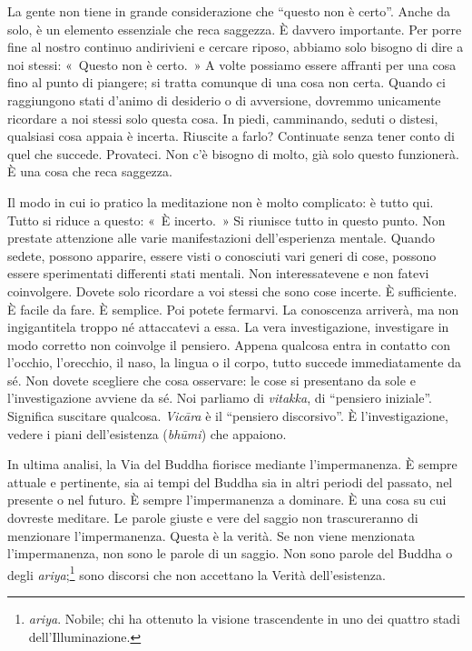 La gente non tiene in grande considerazione che ``questo non è certo''.
Anche da solo, è un elemento essenziale che reca saggezza. È davvero
importante. Per porre fine al nostro continuo andirivieni e cercare
riposo, abbiamo solo bisogno di dire a noi stessi: «~Questo non è
certo.~» A volte possiamo essere affranti per una cosa fino al punto di
piangere; si tratta comunque di una cosa non certa. Quando ci
raggiungono stati d'animo di desiderio o di avversione, dovremmo
unicamente ricordare a noi stessi solo questa cosa. In piedi,
camminando, seduti o distesi, qualsiasi cosa appaia è incerta. Riuscite
a farlo? Continuate senza tener conto di quel che succede. Provateci.
Non c'è bisogno di molto, già solo questo funzionerà. È una cosa che
reca saggezza.

Il modo in cui io pratico la meditazione non è molto complicato: è tutto
qui. Tutto si riduce a questo: «~È incerto.~» Si riunisce tutto in
questo punto. Non prestate attenzione alle varie manifestazioni
dell'esperienza mentale. Quando sedete, possono apparire, essere visti o
conosciuti vari generi di cose, possono essere sperimentati differenti
stati mentali. Non interessatevene e non fatevi coinvolgere. Dovete solo
ricordare a voi stessi che sono cose incerte. È sufficiente. È facile da
fare. È semplice. Poi potete fermarvi. La conoscenza arriverà, ma non
ingigantitela troppo né attaccatevi a essa. La vera investigazione,
investigare in modo corretto non coinvolge il pensiero. Appena qualcosa
entra in contatto con l'occhio, l'orecchio, il naso, la lingua o il
corpo, tutto succede immediatamente da sé. Non dovete scegliere che cosa
osservare: le cose si presentano da sole e l'investigazione avviene da
sé. Noi parliamo di \emph{vitakka}, di ``pensiero iniziale''. Significa
suscitare qualcosa. \emph{Vicāra} è il ``pensiero discorsivo''. È
l'investigazione, vedere i piani dell'esistenza (\emph{bhūmi}) che
appaiono.

In ultima analisi, la Via del Buddha fiorisce mediante l'impermanenza.
È sempre attuale e pertinente, sia ai tempi del Buddha sia in altri
periodi del passato, nel presente o nel futuro. È sempre l'impermanenza
a dominare. È una cosa su cui dovreste meditare. Le parole giuste e vere
del saggio non trascureranno di menzionare l'impermanenza. Questa è la
verità. Se non viene menzionata l'impermanenza, non sono le parole di
un saggio. Non sono parole del Buddha o degli \emph{ariya};\footnote{\emph{ariya}.
  Nobile; chi ha ottenuto la visione trascendente in uno dei quattro
  stadi dell'Illuminazione.} sono discorsi che non accettano la Verità
dell'esistenza.

